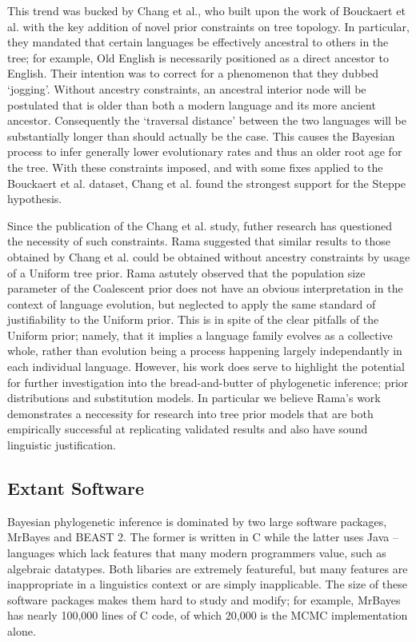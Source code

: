 \documentclass[10pt,journal,compsoc]{IEEEtran}
\begin{document}
This trend was bucked by Chang et al., who built upon the work of Bouckaert et al. with the key addition of novel prior constraints on tree topology.\cite{chang2015ancestry} In particular, they mandated that certain languages be effectively ancestral to others in the tree; for example, Old English is necessarily positioned as a direct ancestor to English. Their intention was to correct for a phenomenon that they dubbed `jogging'. Without ancestry constraints, an ancestral interior node will be postulated that is older than both a modern language and its more ancient ancestor. Consequently the `traversal distance' between the two languages will be substantially longer than should actually be the case. This causes the Bayesian process to infer generally lower evolutionary rates and thus an older root age for the tree. With these constraints imposed, and with some fixes applied to the Bouckaert et al. dataset, Chang et al. found the strongest support for the Steppe hypothesis.

Since the publication of the Chang et al. study, futher research has questioned the necessity of such constraints. Rama suggested that similar results to those obtained by Chang et al. could be obtained without ancestry constraints by usage of a Uniform tree prior.\cite{rama2018three} Rama astutely observed that the population size parameter of the Coalescent prior does not have an obvious interpretation in the context of language evolution, but neglected to apply the same standard of justifiability to the Uniform prior. This is in spite of the clear pitfalls of the Uniform prior; namely, that it implies a language family evolves as a collective whole, rather than evolution being a process happening largely independantly in each individual language. However, his work does serve to highlight the potential for further investigation into the bread-and-butter of phylogenetic inference; prior distributions and substitution models. In particular we believe Rama's work demonstrates a neccessity for research into tree prior models that are both empirically successful at replicating validated results and also have sound linguistic justification. 

\subsection{Extant Software}

Bayesian phylogenetic inference is dominated by two large software packages, MrBayes\cite{ronquist2012mrbayes} and BEAST 2\cite{bouckaert2014beast}. The former is written in C while the latter uses Java -- languages which lack features that many modern programmers value, such as algebraic datatypes. Both libaries are extremely featureful, but many features are inappropriate in a linguistics context or are simply inapplicable. The size of these software packages makes them hard to study and modify; for example, MrBayes has nearly 100,000 lines of C code, of which 20,000 is the MCMC implementation alone.
\end{document}
